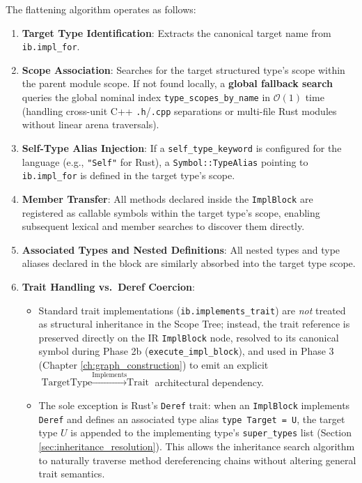 The flattening algorithm operates as follows:
\begin{enumerate}
  \item \textbf{Target Type Identification}: Extracts the canonical target name
    from \texttt{ib.impl\_for}.
  \item \textbf{Scope Association}: Searches for the target
    structured type's scope
    within the parent module scope. If not found locally, a
    \textbf{global fallback search}
    queries the global nominal index \texttt{type\_scopes\_by\_name} in
    $\mathcal{O}(1)$ time (handling cross-unit C++ \texttt{.h}/\texttt{.cpp}
    separations or multi-file Rust modules without linear arena traversals).
  \item \textbf{Self-Type Alias Injection}: If a
    \texttt{self\_type\_keyword} is configured
    for the language (e.g., \texttt{"Self"} for Rust), a
    \texttt{Symbol::TypeAlias} pointing
    to \texttt{ib.impl\_for} is defined in the target type's scope.
  \item \textbf{Member Transfer}: All methods declared inside the
    \texttt{ImplBlock}
    are registered as callable symbols within the target type's
    scope, enabling subsequent
    lexical and member searches to discover them directly.
  \item \textbf{Associated Types and Nested Definitions}: All nested
    types and type aliases
    declared in the block are similarly absorbed into the target type scope.
  \item \textbf{Trait Handling vs.\ Deref Coercion}:
    \begin{itemize}
      \item Standard trait implementations
        (\texttt{ib.implements\_trait}) are \textit{not} \linebreak
        treated as structural inheritance in the Scope Tree; instead,
        the trait reference is
        preserved directly on the IR \texttt{ImplBlock} node,
        resolved to its canonical symbol
        during Phase 2b
        (\texttt{execute\_}\-\texttt{impl\_}\-\texttt{block}), and used in
        Phase 3 (Chapter \ref{ch:graph_construction})
        to emit an explicit $\text{TargetType}
        \!\xrightarrow{\!\text{Implements}\!} \text{Trait}$
        architectural dependency.
      \item The sole exception is Rust's \texttt{Deref} trait: when
        an \texttt{ImplBlock}
        implements \texttt{Deref} and defines an associated type
        alias \texttt{type Target = U},
        the target type $U$ is appended to the implementing type's
        \texttt{super\_}\-\texttt{types} list
        (Section \ref{sec:inheritance_resolution}). This allows the
        inheritance search algorithm
        to naturally traverse method dereferencing chains without
        altering general trait semantics.
    \end{itemize}
\end{enumerate}

